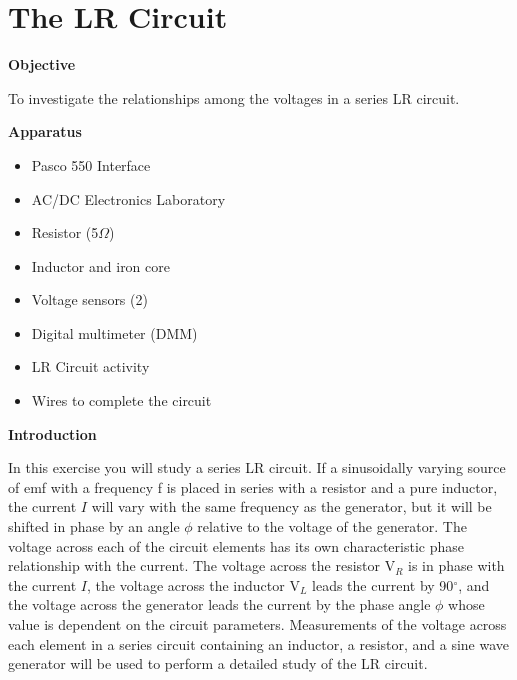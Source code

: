 
\section{The LR Circuit}

\makelabheader %

\textbf{Objective} 

To investigate the relationships among the voltages in a series LR
circuit.

\textbf{Apparatus} 

\begin{itemize}
\item Pasco 550 Interface
\item AC/DC Electronics Laboratory
\item Resistor (5$\Omega$)
\item Inductor and iron core 
\item Voltage sensors (2)
\item Digital multimeter (DMM)
\item LR Circuit activity
\item Wires to complete the circuit
\end{itemize}
\textbf{Introduction} 

In this exercise you will study a series LR circuit. If a sinusoidally
varying source of emf with a frequency f is placed in series with
a resistor and a pure inductor, the current $I$ will vary with the same
frequency as the generator, but it will be shifted in phase by an
angle \( \phi  \) relative to the voltage of the generator. The voltage
across each of the circuit elements has its own characteristic phase
relationship with the current. The voltage across the resistor V\( _{R} \)
is in phase with the current $I$, the voltage across the inductor V\( _{L} \)
leads the current by 90\( ^{\circ } \), and the voltage across the
generator leads the current by the phase angle \( \phi  \) whose
value is dependent on the circuit parameters. Measurements of the
voltage across each element in a series circuit containing an inductor,
a resistor, and a sine wave generator will be used to perform a detailed
study of the LR circuit.

